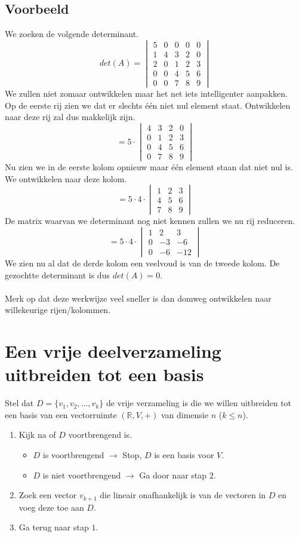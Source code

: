 \documentclass[lineaire_algebra_oplossingen.tex]{subfiles}
\begin{document}
\subsection*{Voorbeeld}
We zoeken de volgende determinant.
\[
det(A) =
\begin{vmatrix}
5 & 0 & 0 & 0 & 0\\
1 & 4 & 3 & 2 & 0\\
2 & 0 & 1 & 2 & 3\\
0 & 0 & 4 & 5 & 6\\
0 & 0 & 7 & 8 & 9
\end{vmatrix}
\]
We zullen niet zomaar ontwikkelen maar het net iets intelligenter aanpakken.\\
Op de eerste rij zien we dat er slechts \'e\'en niet nul element staat. Ontwikkelen naar deze rij zal dus makkelijk zijn.
\[
=
5
\cdot
\begin{vmatrix}
4 & 3 & 2 & 0\\
0 & 1 & 2 & 3\\
0 & 4 & 5 & 6\\
0 & 7 & 8 & 9
\end{vmatrix}
\]
Nu zien we in de eerste kolom opnieuw maar \'e\'en element staan dat niet nul is. We ontwikkelen naar deze kolom.
\[
=
5
\cdot
4
\cdot
\begin{vmatrix}
1 & 2 & 3\\
4 & 5 & 6\\
7 & 8 & 9
\end{vmatrix}
\]
De matrix waarvan we determinant nog niet kennen zullen we nu rij reduceren.
\[
=
5
\cdot
4
\cdot
\begin{vmatrix}
1 & 2 & 3\\
0 & -3 & -6\\
0 & -6 & -12
\end{vmatrix}
\]
We zien nu al dat de derde kolom een veelvoud is van de tweede kolom.
De gezochtte determinant is dus $det(A) = 0$.\\\\
Merk op dat deze werkwijze veel sneller is dan domweg ontwikkelen naar willekeurige rijen/kolommen.

\section{Een vrije deelverzameling uitbreiden tot een basis}
Stel dat $D = \{v_1,v_2,...,v_k\}$ de vrije verzameling is die we willen uitbreiden tot een basis van een vectorruimte $(\mathbb{R},V,+)$ van dimensie $n$ ($k\le n$).
\begin{enumerate}
\item Kijk na of $D$ voortbrengend is.
\begin{itemize}
\item $D$ is voortbrengend $\rightarrow$ Stop, $D$ is een  basis voor $V$.
\item $D$ is niet voortbrengend $\rightarrow$ Ga door naar stap $2$.
\end{itemize}
\item Zoek een vector $v_{k+1}$ die lineair onafhankelijk is van de vectoren in $D$ en voeg deze toe aan $D$.
\item Ga terug naar stap $1$.
\end{enumerate}
\end{document}
